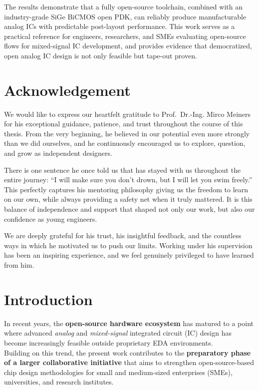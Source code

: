 \documentclass[
  11pt,
  a4paper,
  oneside]{scrbook}
\begin{document}
The results demonstrate that a fully open-source toolchain, combined
with an industry-grade SiGe BiCMOS open PDK, can reliably produce
manufacturable analog ICs with predictable post-layout performance. This
work serves as a practical reference for engineers, researchers, and
SMEs evaluating open-source flows for mixed-signal IC development, and
provides evidence that democratized, open analog IC design is not only
feasible but tape-out proven.


\chapter*{Acknowledgement}\label{acknowledgement}


We would like to express our heartfelt gratitude to Prof.~Dr.-Ing. Mirco
Meiners for his exceptional guidance, patience, and trust throughout the
course of this thesis. From the very beginning, he believed in our
potential even more strongly than we did ourselves, and he continuously
encouraged us to explore, question, and grow as independent designers.

There is one sentence he once told us that has stayed with us throughout
the entire journey: ``I will make sure you don't drown, but I will let
you swim freely.'' This perfectly captures his mentoring philosophy
giving us the freedom to learn on our own, while always providing a
safety net when it truly mattered. It is this balance of independence
and support that shaped not only our work, but also our confidence as
young engineers.

We are deeply grateful for his trust, his insightful feedback, and the
countless ways in which he motivated us to push our limits. Working
under his supervision has been an inspiring experience, and we feel
genuinely privileged to have learned from him.


\chapter{Introduction}\label{introduction}

In recent years, the \textbf{open-source hardware ecosystem} has matured
to a point where advanced \emph{analog} and \emph{mixed-signal}
integrated circuit (IC) design has become increasingly feasible outside
proprietary EDA environments.\\
Building on this trend, the present work contributes to the
\textbf{preparatory phase of a larger collaborative initiative} that
aims to strengthen open-source-based chip design methodologies for small
and medium-sized enterprises (SMEs), universities, and research
institutes.
\end{document}
